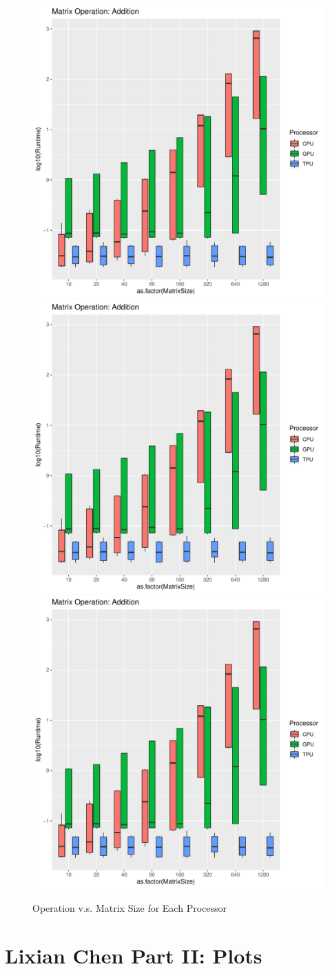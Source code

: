 \documentclass[
]{article}
\begin{document}
\begin{figure}
\includegraphics[page=1,width=0.5\linewidth]{../figs/operation_size.pdf}
\includegraphics[page=2,width=0.5\linewidth]{../figs/operation_size.pdf}
\includegraphics[page=3,width=0.5\linewidth]{../figs/operation_size.pdf}
\caption{\label{fig:operation_size} Operation v.s. Matrix Size for Each Processor}
\end{figure}

\hypertarget{lixian-chen-part-ii-plots}{%
\section{Lixian Chen Part II: Plots}\label{lixian-chen-part-ii-plots}}
\end{document}
